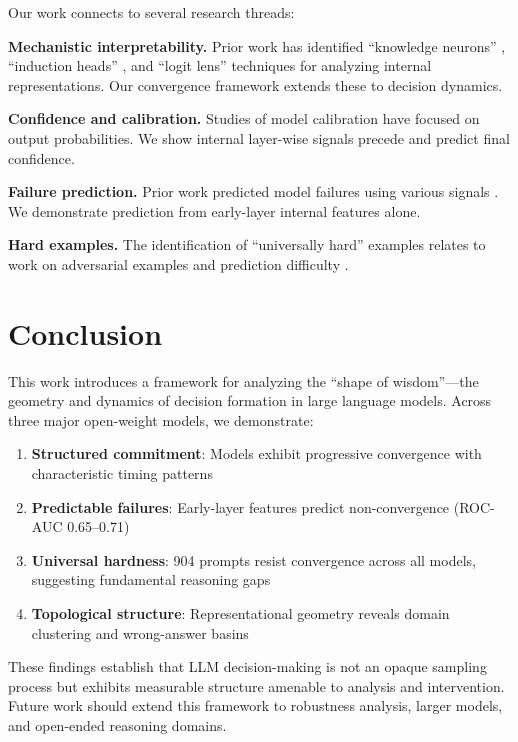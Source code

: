 \documentclass[11pt]{article}
\theoremstyle{definition}
\begin{document}
Our work connects to several research threads:

\textbf{Mechanistic interpretability.} Prior work has identified ``knowledge neurons'' \citep{dai2021knowledge}, ``induction heads'' \citep{elhage2021mathematical}, and ``logit lens'' techniques \citep{nostalgebraist2020logit} for analyzing internal representations. Our convergence framework extends these to decision dynamics.

\textbf{Confidence and calibration.} Studies of model calibration \citep{jiang2021can,desai2020calibration} have focused on output probabilities. We show internal layer-wise signals precede and predict final confidence.

\textbf{Failure prediction.} Prior work predicted model failures using various signals \citep{kadavath2022language}. We demonstrate prediction from early-layer internal features alone.

\textbf{Hard examples.} The identification of ``universally hard'' examples relates to work on adversarial examples \citep{wallace2019universal} and prediction difficulty 
\citep{swayamdipta2020dataset}.

\section{Conclusion}

This work introduces a framework for analyzing the ``shape of wisdom''---the geometry and dynamics of decision formation in large language models. Across three major open-weight models, we demonstrate:

\begin{enumerate}
    \item \textbf{Structured commitment}: Models exhibit progressive convergence with characteristic timing patterns
    \item \textbf{Predictable failures}: Early-layer features predict non-convergence (ROC-AUC 0.65--0.71)
    \item \textbf{Universal hardness}: 904 prompts resist convergence across all models, suggesting fundamental reasoning gaps
    \item \textbf{Topological structure}: Representational geometry reveals domain clustering and wrong-answer basins
\end{enumerate}

These findings establish that LLM decision-making is not an opaque sampling process but exhibits measurable structure amenable to analysis and intervention. Future work should extend this framework to robustness analysis, larger models, and open-ended reasoning domains.
\end{document}
